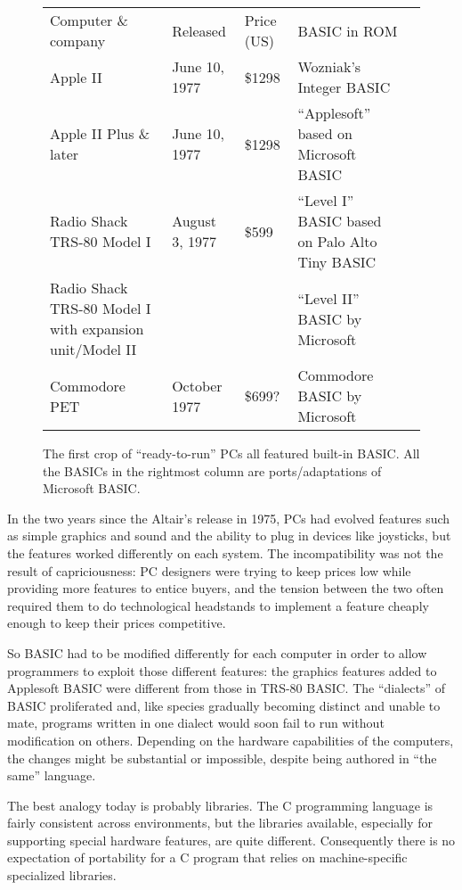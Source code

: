 \begin{figure}
  \begin{tabular}{|l|l|l|l|l|}
  \hline
  Computer \& company 
  & Released 
  & Price (US) 
  & BASIC in ROM
  \\
  Apple II
  & June 10, 1977 
  & \$1298 
  & Wozniak's Integer BASIC 
  \\
  Apple II Plus \& later
  & June 10, 1977 
  & \$1298 
  & ``Applesoft'' based on Microsoft BASIC
  \\
  Radio Shack TRS-80 Model I
  & August 3, 1977 
  &   \$599 
  & ``Level I'' BASIC based on Palo Alto Tiny BASIC
  \\
  Radio Shack TRS-80 Model I with expansion unit/Model II
  & 
  & 
  & ``Level II'' BASIC by Microsoft
  \\
  Commodore PET
  & October 1977 
  & \$699? 
  & Commodore BASIC by Microsoft
  \\
  \end{tabular}
  \caption{\label{fig:timeline} The first crop of ``ready-to-run'' PCs
    all featured built-in BASIC.  All the BASICs in the rightmost column
    are ports/adaptations of Microsoft BASIC.}
\end{figure}

In the two years since the Altair's release in 1975, PCs had evolved 
features such as simple graphics
and sound and the ability to plug in devices like joysticks, but the
features worked differently on each system.  The incompatibility was not
the result of capriciousness: PC designers were trying to keep prices
low while providing more features to entice buyers, and the tension
between the two often required them to do technological headstands to
implement a feature cheaply enough to keep their prices competitive.

So BASIC had to be modified differently for each computer in order to
allow programmers to exploit those different features: the graphics
features added to Applesoft BASIC were different from those in TRS-80
BASIC.
  The
``dialects'' of BASIC proliferated and, like species gradually becoming
distinct and unable to mate, programs written in one dialect would soon
fail to run without modification on others.  Depending on the hardware
capabilities of the computers, the changes might be substantial or
impossible,
despite being authored in ``the same'' language.

\begin{geeknote}
The best analogy today is probably libraries.  The C programming
language is fairly consistent across environments, but the libraries
available, especially for supporting special hardware features, are
quite different.  Consequently there is no expectation of portability
for a C program 
that relies on machine-specific specialized libraries.
\end{geeknote}


